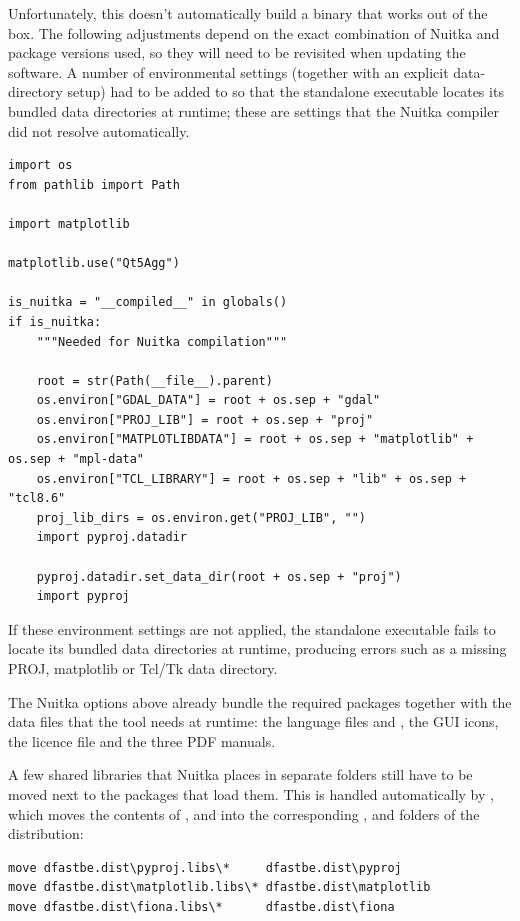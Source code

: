 Unfortunately, this doesn't automatically build a binary that works out of the box.
The following adjustments depend on the exact combination of Nuitka and package versions used, so they will need to be revisited when updating the software.
A number of environmental settings (together with an explicit  data-directory setup) had
to be added to  so that the standalone executable locates its bundled data
directories at runtime; these are settings that the Nuitka compiler did not resolve automatically.

\begin{Verbatim}
import os
from pathlib import Path

import matplotlib

matplotlib.use("Qt5Agg")

is_nuitka = "__compiled__" in globals()
if is_nuitka:
    """Needed for Nuitka compilation"""

    root = str(Path(__file__).parent)
    os.environ["GDAL_DATA"] = root + os.sep + "gdal"
    os.environ["PROJ_LIB"] = root + os.sep + "proj"
    os.environ["MATPLOTLIBDATA"] = root + os.sep + "matplotlib" + os.sep + "mpl-data"
    os.environ["TCL_LIBRARY"] = root + os.sep + "lib" + os.sep + "tcl8.6"
    proj_lib_dirs = os.environ.get("PROJ_LIB", "")
    import pyproj.datadir

    pyproj.datadir.set_data_dir(root + os.sep + "proj")
    import pyproj
\end{Verbatim}

If these environment settings are not applied, the standalone executable fails to locate its bundled
data directories at runtime, producing errors such as a missing PROJ, matplotlib or Tcl/Tk data
directory.

The Nuitka options above already bundle the required packages together with the data files that the
tool needs at runtime: the language files  and , the GUI
icons, the licence file and the three PDF manuals.

A few shared libraries that Nuitka places in separate  folders still have to be moved
next to the packages that load them. This is handled automatically by ,
which moves the contents of ,  and  into the
corresponding ,  and  folders of the distribution:

\begin{Verbatim}
move dfastbe.dist\pyproj.libs\*     dfastbe.dist\pyproj
move dfastbe.dist\matplotlib.libs\* dfastbe.dist\matplotlib
move dfastbe.dist\fiona.libs\*      dfastbe.dist\fiona
\end{Verbatim}


